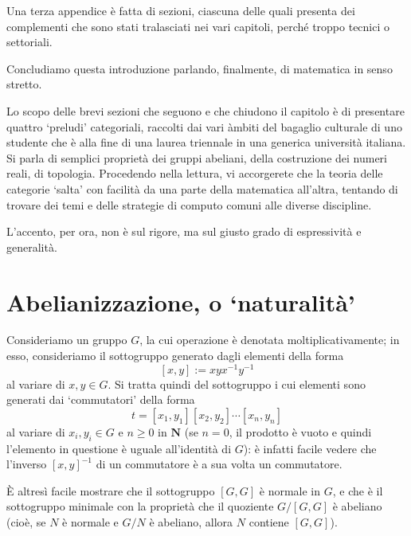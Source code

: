 Una terza appendice è fatta di sezioni, ciascuna delle quali presenta dei complementi che sono stati tralasciati nei vari capitoli, perché troppo tecnici o settoriali.\Todo{}

\medskip
Concludiamo questa introduzione parlando, finalmente, di matematica in senso stretto.

Lo scopo delle brevi sezioni che seguono e che chiudono il capitolo è di presentare quattro `preludi' categoriali, raccolti dai vari àmbiti del bagaglio culturale di uno studente che è alla fine di una laurea triennale in una generica università italiana. Si parla di semplici proprietà dei gruppi abeliani, della costruzione dei numeri reali, di topologia. Procedendo nella lettura, vi accorgerete che la teoria delle categorie `salta' con facilità da una parte della matematica all'altra, tentando di trovare dei temi e delle strategie di computo comuni alle diverse discipline.

L'accento, per ora, non è sul rigore, ma sul giusto grado di espressività e generalità.
\section*{Abelianizzazione, o `naturalità'}
Consideriamo un gruppo \(G\), la cui operazione è denotata moltiplicativamente; in esso, consideriamo il sottogruppo generato dagli elementi della forma
\[[x,y]:= xyx^{-1}y^{-1}\]
al variare di \(x,y\in G\). Si tratta quindi del sottogruppo i cui elementi sono generati dai `commutatori' della forma
\[t = [x_1,y_1][x_2,y_2]\cdots[x_n,y_n]\]
al variare di \(x_i,y_i\in G\) e \(n\ge 0\) in \(\mathbf{N}\) (se \(n=0\), il prodotto è vuoto e quindi l'elemento in questione è uguale all'identità di \(G\)): è infatti facile vedere che l'inverso \([x,y]^{-1}\) di un commutatore è a sua volta un commutatore.

\`E altresì facile mostrare che il sottogruppo \([G,G]\) è normale in \(G\), e che è il sottogruppo minimale con la proprietà che il quoziente \(G/[G,G]\) è abeliano (cioè, se \(N\) è normale e \(G/N\) è abeliano, allora \(N\) contiene \([G,G]\)).

